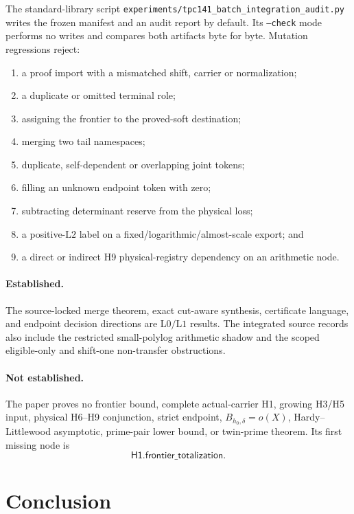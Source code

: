 \documentclass[11pt]{article}
\theoremstyle{definition}
\theoremstyle{remark}
\newcommand{\Lzero}{\mathrm{L0}}
\newcommand{\Lone}{\mathrm{L1}}
\newcommand{\Ltwo}{\mathrm{L2}}
\newcommand{\Bhard}{B_{h_0,\delta}}
\begin{document}
The standard-library script
\texttt{experiments/tpc141\_batch\_integration\_audit.py} writes the
frozen manifest and an audit report by default.  Its
\texttt{--check} mode performs no writes and compares both artifacts
byte for byte.  Mutation regressions reject:
\begin{enumerate}[leftmargin=2em]
\item a proof import with a mismatched shift, carrier or
  normalization;
\item a duplicate or omitted terminal role;
\item assigning the frontier to the proved-soft destination;
\item merging two tail namespaces;
\item duplicate, self-dependent or overlapping joint tokens;
\item filling an unknown endpoint token with zero;
\item subtracting determinant reserve from the physical loss;
\item a positive-\(\Ltwo\) label on a fixed/logarithmic/almost-scale
  export; and
\item a direct or indirect H9 physical-registry dependency on an
  arithmetic node.
\end{enumerate}

\paragraph{Established.}
The source-locked merge theorem, exact cut-aware synthesis,
certificate language, and endpoint decision directions are
\(\Lzero/\Lone\) results.  The integrated source records also include
the restricted small-polylog arithmetic shadow and the scoped
eligible-only and shift-one non-transfer obstructions.

\paragraph{Not established.}
The paper proves no frontier bound, complete actual-carrier H1,
growing H3/H5 input, physical H6--H9 conjunction, strict endpoint,
\(\Bhard=o(X)\), Hardy--Littlewood asymptotic, prime-pair lower
bound, or twin-prime theorem.  Its first missing node is
\[
 \boxed{\mathsf{H1.frontier\_totalization}}.
\]

\section{Conclusion}
\end{document}
